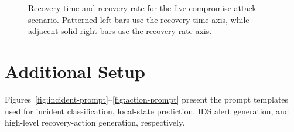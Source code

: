 \documentclass[sigconf]{acmart}
\begin{document}
\begin{figure}[t]
{
}
\caption{Recovery time and recovery rate for the five-compromise attack scenario. Patterned left bars use the recovery-time axis, while adjacent solid right bars use the recovery-rate axis.}
\label{fig:recovery-time-5}
\end{figure}















\clearpage
\appendix

\section{Additional Setup}

Figures~\ref{fig:incident-prompt}--\ref{fig:action-prompt} present the prompt
templates used for incident classification, local-state prediction, IDS
alert generation, and high-level recovery-action generation, respectively.
\end{document}
